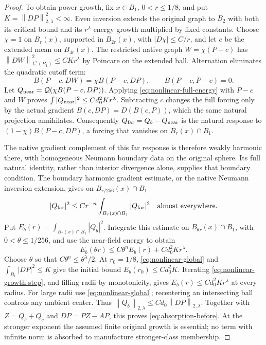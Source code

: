 \documentclass[reqno,11pt]{amsart}
\numberwithin{equation}{section}
\theoremstyle{definition}
\theoremstyle{remark}
\newcommand{\norm}[1]{\left\lVert#1\right\rVert}
\begin{document}
\begin{proof}
To obtain power growth, fix $x\in B_1$, $0<r\leq1/8$, and put
$K=\norm{DP}_{2,\lambda}^2<\infty$. Even inversion extends the
original graph to $B_2$ with both its critical bound and its
$r^\lambda$ energy growth multiplied by fixed constants. Choose
$\chi=1$ on $B_r(x)$, supported in $B_{2r}(x)$, with
$|D\chi|\leq C/r$, and let $c$ be the extended mean on $B_{4r}(x)$.
The restricted native graph $W=\chi(P-c)$ has
$\norm{DW}_{L^2(B_1)}^2\leq CKr^\lambda$ by Poincare on the extended
ball. Alternation eliminates the quadratic cutoff term:
\[
 B(P-c,DW)=\chi B(P-c,DP),\qquad B(P-c,P-c)=0.
\]
Let $Q_{\rm near}=\mathcal Q(\chi B(P-c,DP))$. Applying
\eqref{eq:nonlinear-full-energy} with $P-c$ and $W$ proves
$\int|Q_{\rm near}|^2\leq Cd_0^2Kr^\lambda$.
Subtracting $c$ changes the full forcing only by the actual gradient
$B(c,DP)=D(B(c,P))$, which the same natural projection annihilates.
Consequently $Q_{\rm far}=Q_b-Q_{\rm near}$ is the natural response to
$(1-\chi)B(P-c,DP)$, a forcing that vanishes on $B_r(x)\cap B_1$.

The native gradient complement of this far response is therefore
weakly harmonic there, with homogeneous Neumann boundary data on the
original sphere. Its full natural identity, rather than interior
divergence alone, supplies that boundary condition. The boundary
harmonic gradient estimate, or the native Neumann inversion extension,
gives on $B_{r/256}(x)\cap B_1$
\[
 |Q_{\rm far}|^2\leq Cr^{-n}
      \int_{B_r(x)\cap B_1}|Q_{\rm far}|^2
 \quad\text{almost everywhere}.
\]
Put $E_b(r)=\int_{B_r(x)\cap B_1}|Q_b|^2$. Integrate this estimate
on $B_{\theta r}(x)\cap B_1$, with $0<\theta\leq1/256$, and use
the near-field energy to obtain
\begin{equation}\label{eq:nonlinear-growth-step}
 E_b(\theta r)\leq C\theta^nE_b(r)+Cd_0^2Kr^\lambda.
\end{equation}
Choose $\theta$ so that $C\theta^n\leq\theta^\lambda/2$.
At $r_0=1/8$, \eqref{eq:nonlinear-global} and
$\int_{B_1}|DP|^2\leq K$ give the initial bound
$E_b(r_0)\leq Cd_0^2K$. Iterating
\eqref{eq:nonlinear-growth-step}, and filling radii by monotonicity,
gives $E_b(r)\leq Cd_0^2Kr^\lambda$ at every radius. For large radii
use \eqref{eq:nonlinear-global}; recentering an intersecting ball
controls any ambient center. Thus
$\norm{Q_b}_{2,\lambda}\leq Cd_0\norm{DP}_{2,\lambda}$.
Together with $Z=Q_b+Q_c$ and $DP=PZ-AP$, this proves
\eqref{eq:absorption-before}. At the stronger exponent the assumed
finite original growth is essential; no term with infinite norm is
absorbed to manufacture stronger-class membership.


\end{proof}
\end{document}
